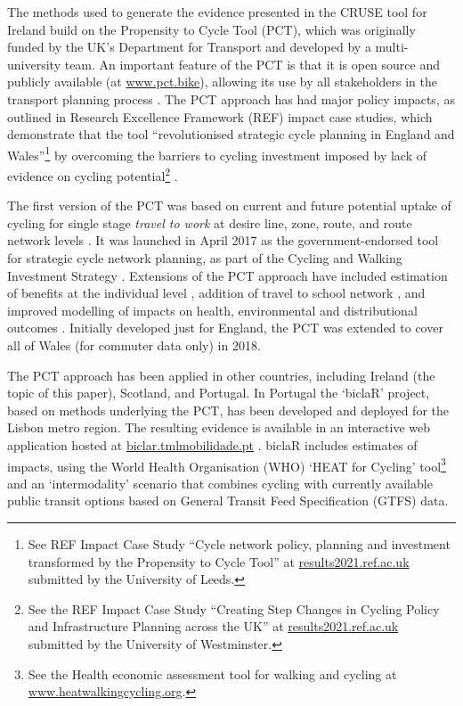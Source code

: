 \documentclass[
  super,
  preprint,
  3p]{elsarticle}
\begin{document}
The methods used to generate the evidence presented in the CRUSE tool
for Ireland build on the Propensity to Cycle Tool (PCT), which was
originally funded by the UK's Department for Transport and developed by
a multi-university team. An important feature of the PCT is that it is
open source and publicly available (at
\href{https://www.pct.bike/}{www.pct.bike}), allowing its use by all
stakeholders in the transport planning process \citep{lovelace2017}. The
PCT approach has had major policy impacts, as outlined in Research
Excellence Framework (REF) impact case studies, which demonstrate that
the tool ``revolutionised strategic cycle planning in England and
Wales''\footnote{See REF Impact Case Study ``Cycle network policy,
  planning and investment transformed by the Propensity to Cycle Tool''
  at
  \href{https://results2021.ref.ac.uk/impact/847d1191-7f25-46ba-a399-b481125edc8f}{results2021.ref.ac.uk}
  submitted by the University of Leeds.} by overcoming the barriers to
cycling investment imposed by lack of evidence on cycling
potential\footnote{See the REF Impact Case Study ``Creating Step Changes
  in Cycling Policy and Infrastructure Planning across the UK'' at
  \href{https://results2021.ref.ac.uk/impact/4BBF3436-FD10-4C75-9791-F5E98AB4411B}{results2021.ref.ac.uk}
  submitted by the University of Westminster.} .

The first version of the PCT was based on current and future potential
uptake of cycling for single stage \emph{travel to work} at desire line,
zone, route, and route network levels \citep{lovelace2016}. It was
launched in April 2017 as the government-endorsed tool for strategic
cycle network planning, as part of the Cycling and Walking Investment
Strategy \citep{cycling2017}. Extensions of the PCT approach have
included estimation of benefits at the individual level
\citep{woodcock2018}, addition of travel to school network
\citep{goodman2019}, and improved modelling of impacts on health,
environmental and distributional outcomes \citep{woodcock2021}.
Initially developed just for England, the PCT was extended to cover all
of Wales (for commuter data only) in 2018.

The PCT approach has been applied in other countries, including Ireland
(the topic of this paper), Scotland, and Portugal. In Portugal the
`biclaR' project, based on methods underlying the PCT, has been
developed and deployed for the Lisbon metro region. The resulting
evidence is available in an interactive web application hosted at
\href{https://biclar.tmlmobilidade.pt}{biclar.tmlmobilidade.pt}
\citep{felix2023}. biclaR includes estimates of impacts, using the World
Health Organisation (WHO) `HEAT for Cycling' tool\footnote{See the
  Health economic assessment tool for walking and cycling at
  \href{https://www.heatwalkingcycling.org/\#homepage}{www.heatwalkingcycling.org}.}
and an `intermodality' scenario that combines cycling with currently
available public transit options based on General Transit Feed
Specification (GTFS) data.
\end{document}
